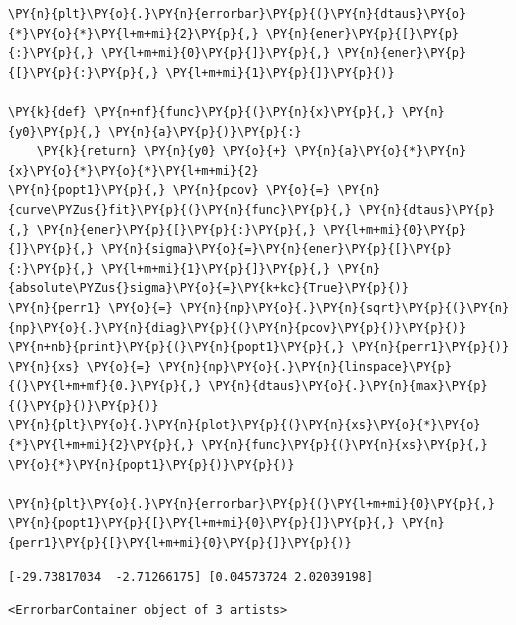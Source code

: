     \begin{tcolorbox}[breakable, size=fbox, boxrule=1pt, pad at break*=1mm,colback=cellbackground, colframe=cellborder]
\begin{Verbatim}[commandchars=\\\{\}]
\PY{n}{plt}\PY{o}{.}\PY{n}{errorbar}\PY{p}{(}\PY{n}{dtaus}\PY{o}{*}\PY{o}{*}\PY{l+m+mi}{2}\PY{p}{,} \PY{n}{ener}\PY{p}{[}\PY{p}{:}\PY{p}{,} \PY{l+m+mi}{0}\PY{p}{]}\PY{p}{,} \PY{n}{ener}\PY{p}{[}\PY{p}{:}\PY{p}{,} \PY{l+m+mi}{1}\PY{p}{]}\PY{p}{)}

\PY{k}{def} \PY{n+nf}{func}\PY{p}{(}\PY{n}{x}\PY{p}{,} \PY{n}{y0}\PY{p}{,} \PY{n}{a}\PY{p}{)}\PY{p}{:}
    \PY{k}{return} \PY{n}{y0} \PY{o}{+} \PY{n}{a}\PY{o}{*}\PY{n}{x}\PY{o}{*}\PY{o}{*}\PY{l+m+mi}{2}
\PY{n}{popt1}\PY{p}{,} \PY{n}{pcov} \PY{o}{=} \PY{n}{curve\PYZus{}fit}\PY{p}{(}\PY{n}{func}\PY{p}{,} \PY{n}{dtaus}\PY{p}{,} \PY{n}{ener}\PY{p}{[}\PY{p}{:}\PY{p}{,} \PY{l+m+mi}{0}\PY{p}{]}\PY{p}{,} \PY{n}{sigma}\PY{o}{=}\PY{n}{ener}\PY{p}{[}\PY{p}{:}\PY{p}{,} \PY{l+m+mi}{1}\PY{p}{]}\PY{p}{,} \PY{n}{absolute\PYZus{}sigma}\PY{o}{=}\PY{k+kc}{True}\PY{p}{)}
\PY{n}{perr1} \PY{o}{=} \PY{n}{np}\PY{o}{.}\PY{n}{sqrt}\PY{p}{(}\PY{n}{np}\PY{o}{.}\PY{n}{diag}\PY{p}{(}\PY{n}{pcov}\PY{p}{)}\PY{p}{)}
\PY{n+nb}{print}\PY{p}{(}\PY{n}{popt1}\PY{p}{,} \PY{n}{perr1}\PY{p}{)}
\PY{n}{xs} \PY{o}{=} \PY{n}{np}\PY{o}{.}\PY{n}{linspace}\PY{p}{(}\PY{l+m+mf}{0.}\PY{p}{,} \PY{n}{dtaus}\PY{o}{.}\PY{n}{max}\PY{p}{(}\PY{p}{)}\PY{p}{)}
\PY{n}{plt}\PY{o}{.}\PY{n}{plot}\PY{p}{(}\PY{n}{xs}\PY{o}{*}\PY{o}{*}\PY{l+m+mi}{2}\PY{p}{,} \PY{n}{func}\PY{p}{(}\PY{n}{xs}\PY{p}{,} \PY{o}{*}\PY{n}{popt1}\PY{p}{)}\PY{p}{)}

\PY{n}{plt}\PY{o}{.}\PY{n}{errorbar}\PY{p}{(}\PY{l+m+mi}{0}\PY{p}{,} \PY{n}{popt1}\PY{p}{[}\PY{l+m+mi}{0}\PY{p}{]}\PY{p}{,} \PY{n}{perr1}\PY{p}{[}\PY{l+m+mi}{0}\PY{p}{]}\PY{p}{)}
\end{Verbatim}
\end{tcolorbox}

    \begin{Verbatim}[commandchars=\\\{\}]
[-29.73817034  -2.71266175] [0.04573724 2.02039198]
    \end{Verbatim}

            \begin{tcolorbox}[breakable, size=fbox, boxrule=.5pt, pad at break*=1mm, opacityfill=0]
\begin{Verbatim}[commandchars=\\\{\}]
<ErrorbarContainer object of 3 artists>
\end{Verbatim}
\end{tcolorbox}
        
